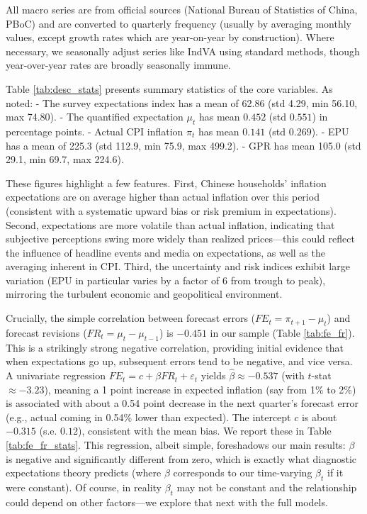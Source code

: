 \documentclass[12pt]{article}
\begin{document}
All macro series are from official sources (National Bureau of Statistics of China, PBoC) and are converted to quarterly frequency (usually by averaging monthly values, except growth rates which are year-on-year by construction). Where necessary, we seasonally adjust series like IndVA using standard methods, though year-over-year rates are broadly seasonally immune.

Table \ref{tab:desc_stats} presents summary statistics of the core variables. As noted:
- The survey expectations index has a mean of 62.86 (std 4.29, min 56.10, max 74.80).
- The quantified expectation $\mu_t$ has mean $0.452$ (std $0.551$) in percentage points.
- Actual CPI inflation $\pi_t$ has mean $0.141$ (std $0.269$).
- EPU has a mean of 225.3 (std 112.9, min 75.9, max 499.2).
- GPR has mean 105.0 (std 29.1, min 69.7, max 224.6).

These figures highlight a few features. First, Chinese households' inflation expectations are on average higher than actual inflation over this period (consistent with a systematic upward bias or risk premium in expectations). Second, expectations are more volatile than actual inflation, indicating that subjective perceptions swing more widely than realized prices—this could reflect the influence of headline events and media on expectations, as well as the averaging inherent in CPI. Third, the uncertainty and risk indices exhibit large variation (EPU in particular varies by a factor of 6 from trough to peak), mirroring the turbulent economic and geopolitical environment.

Crucially, the simple correlation between forecast errors ($FE_t = \pi_{t+1}-\mu_t$) and forecast revisions ($FR_t = \mu_t - \mu_{t-1}$) is $-0.451$ in our sample (Table \ref{tab:fe_fr}). This is a strikingly strong negative correlation, providing initial evidence that when expectations go up, subsequent errors tend to be negative, and vice versa. A univariate regression $FE_t = c + \beta FR_t + \varepsilon_t$ yields $\hat{\beta} \approx -0.537$ (with $t$-stat $\approx -3.23$), meaning a 1 point increase in expected inflation (say from 1\% to 2\%) is associated with about a 0.54 point decrease in the next quarter's forecast error (e.g., actual coming in 0.54\% lower than expected). The intercept $c$ is about $-0.315$ (s.e. $0.12$), consistent with the mean bias. We report these in Table \ref{tab:fe_fr_stats}. This regression, albeit simple, foreshadows our main results: $\beta$ is negative and significantly different from zero, which is exactly what diagnostic expectations theory predicts (where $\beta$ corresponds to our time-varying $\beta_t$ if it were constant). Of course, in reality $\beta_t$ may not be constant and the relationship could depend on other factors—we explore that next with the full models.
\end{document}
